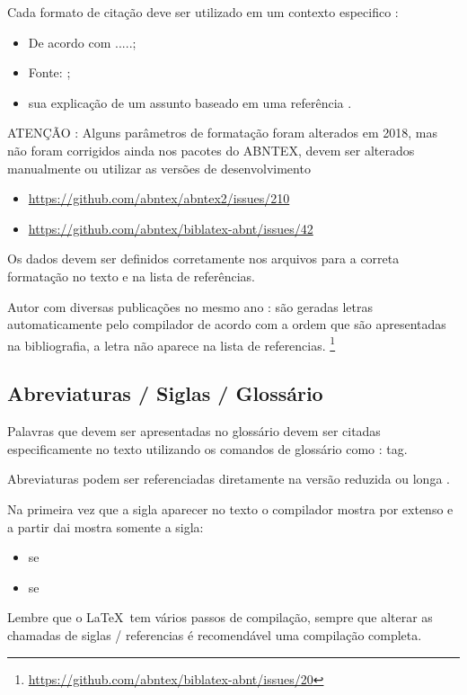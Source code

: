 Cada formato de citação deve ser utilizado em um contexto especifico :
\begin{itemize}
    \item De acordo com  .....;
    \item Fonte: ;
    \item sua explicação de um assunto baseado em uma referência \cite{SCRUMGUIDE:2013}.
\end{itemize}

ATENÇÃO : Alguns parâmetros de formatação foram alterados em 2018, mas não foram corrigidos ainda nos pacotes do ABNTEX, devem ser alterados manualmente ou utilizar as versões de desenvolvimento
\begin{itemize}
    \item \url{https://github.com/abntex/abntex2/issues/210}
    \item \url{https://github.com/abntex/biblatex-abnt/issues/42}
\end{itemize}

Os dados devem ser definidos corretamente nos arquivos  para a correta formatação no texto e na lista de referências.

Autor com diversas publicações no mesmo ano : são geradas letras automaticamente pelo compilador de acordo com a ordem que são apresentadas na bibliografia, a letra não aparece na lista de referencias. \footnote{\url{https://github.com/abntex/biblatex-abnt/issues/20}}


\subsection{Abreviaturas / Siglas / Glossário}
\label{siglas-glossario}

Palavras que devem ser apresentadas no glossário devem ser citadas especificamente no texto utilizando os comandos de glossário como : \gls{tag}.

Abreviaturas podem ser referenciadas diretamente na versão reduzida  \space  
ou longa .

Na primeira vez que a sigla aparecer no texto o compilador mostra por extenso e a partir dai mostra somente a sigla:

\begin{itemize}
    \item \gls{se}
    \item \gls{se}
\end{itemize}

Lembre que o \LaTeX \ tem vários passos de compilação, sempre que alterar as chamadas de siglas / referencias é recomendável uma compilação completa.





